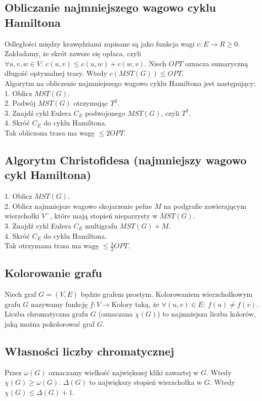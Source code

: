 \subsection*{Obliczanie najmniejszego wagowo cyklu Hamiltona}
Odległości między krawędziami zapisane są jako funkcja wagi $c: E \to R \geq 0$.
Zakładamy, że skrót zawsze się opłaca, czyli 
$\forall u, v, w \in V: \ c(u,v) \leq c(u,w) + c(w, v)$. Niech $OPT$ oznacza
sumaryczną długość optymalnej trasy. Wtedy $c(MST(G)) \leq OPT$. \\
Algorytm na obliczenie najmniejszego wagowo cyklu Hamiltona jest następujący: \\
1. Oblicz $MST(G)$. \\
2. Podwój $MST(G)$ otrzymując $T^2$. \\
3. Znajdź cykl Eulera $C_E$ podwojonego $MST(G)$, czyli $T^2$. \\
4. Skróć $C_E$ do cyklu Hamiltona. \\
Tak obliczona trasa ma wagę $\leq 2 OPT$.

\subsection*{Algorytm Christofidesa (najmniejszy wagowo cykl Hamiltona)}
1. Oblicz $MST(G)$. \\
2. Oblicz najmniejsze wagowo skojarzenie pełne $M$ na podgrafie zawierającym
wierzchołki $V^{-}$, które mają stopień nieparzysty w $MST(G)$. \\
3. Znajdź cykl Eulera $C_E$ multigrafu $MST(G) + M$. \\
4. Skróć $C_E$ do cyklu Hamiltona. \\
Tak otrzymana trasa ma wagę $\leq \frac{3}{2} OPT$.

\subsection*{Kolorowanie grafu}
Niech graf $G = (V, E)$ będzie grafem prostym. Kolorowaniem wierzchołkowym
grafu $G$ nazywamy funkcję $f: V \to \text{Kolory}$ taką, że 
$\forall (u, v) \in E: \ f(u) \neq f(v)$. Liczba chromatyczna grafu $G$ 
(oznaczana $\chi (G)$) to najmniejsza liczba kolorów, jaką można pokolorować 
graf $G$.

\subsection*{Własności liczby chromatycznej}
Przez $\omega (G)$ oznaczamy wielkość największej kliki zawartej w $G$.
Wtedy $\chi (G) \geq \omega (G)$. $\Delta (G)$ to największy stopień wierzchołka
w $G$. Wtedy $\chi (G) \leq \Delta (G) + 1$.

